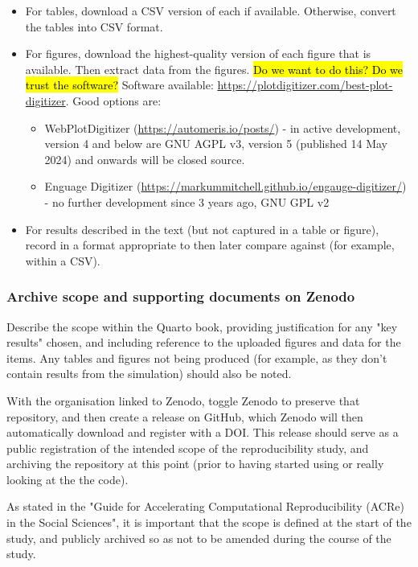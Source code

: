 \begin{itemize}
    \item For tables, download a CSV version of each if available. Otherwise, convert the tables into CSV format.
    \item For figures, download the highest-quality version of each figure that is available. Then extract data from the figures. \hl{Do we want to do this? Do we trust the software?} Software available: \url{https://plotdigitizer.com/best-plot-digitizer}. Good options are:
    \begin{itemize}
        \item WebPlotDigitizer (\url{https://automeris.io/posts/}) - in active development, version 4 and below are GNU AGPL v3, version 5 (published 14 May 2024) and onwards will be closed source.
        \item Enguage Digitizer (\url{https://markummitchell.github.io/engauge-digitizer/}) - no further development since 3 years ago, GNU GPL v2
    \end{itemize}
    \item For results described in the text (but not captured in a table or figure), record in a format appropriate to then later compare against (for example, within a CSV).
\end{itemize}

\subsubsection{Archive scope and supporting documents on Zenodo}
\timeyes

Describe the scope within the Quarto book, providing justification for any "key results" chosen, and including reference to the uploaded figures and data for the items. Any tables and figures not being produced (for example, as they don't contain results from the simulation) should also be noted.

With the organisation linked to Zenodo, toggle Zenodo to preserve that repository, and then create a release on GitHub, which Zenodo will then automatically download and register with a DOI. This release should serve as a public registration of the intended scope of the reproducibility study, and archiving the repository at this point (prior to having started using or really looking at the the code).

As stated in the "Guide for Accelerating Computational Reproducibility (ACRe) in the Social Sciences", it is important that the scope is defined at the start of the study, and publicly archived so as not to be amended during the course of the study.\cite{berkeley_initiative_for_transparency_in_the_social_sciences_guide_2022}

